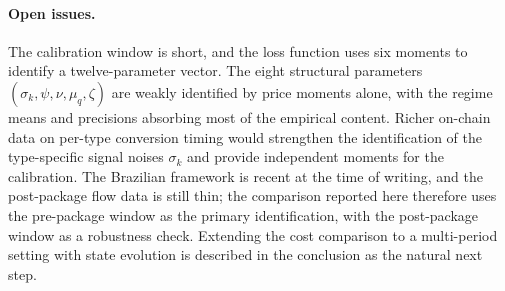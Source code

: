 \paragraph{Open issues.} The calibration window is short, and the loss function uses six moments to identify a twelve-parameter vector. The eight structural parameters $(\sigma_k, \psi, \nu, \mu_q, \zeta)$ are weakly identified by price moments alone, with the regime means and precisions absorbing most of the empirical content. Richer on-chain data on per-type conversion timing would strengthen the identification of the type-specific signal noises $\sigma_k$ and provide independent moments for the calibration. The Brazilian framework is recent at the time of writing, and the post-package flow data is still thin; the comparison reported here therefore uses the pre-package window as the primary identification, with the post-package window as a robustness check. Extending the cost comparison to a multi-period setting with state evolution is described in the conclusion as the natural next step.
